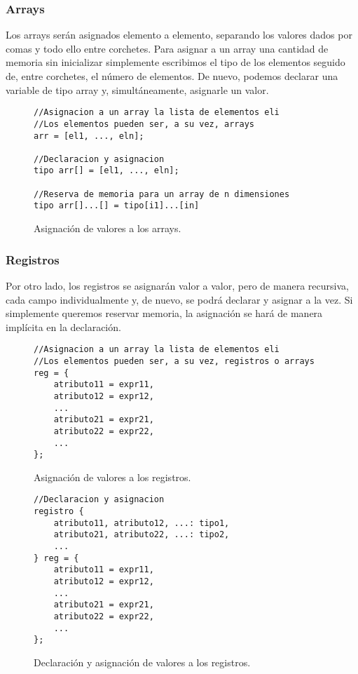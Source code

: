 \subsubsection{Arrays}
Los arrays serán asignados elemento a elemento, separando los valores dados por
comas y todo ello entre corchetes. Para asignar a un array una cantidad de
memoria sin inicializar simplemente escribimos el tipo de los elementos seguido
de, entre corchetes, el número de elementos. De nuevo, podemos declarar una
variable de tipo array y, simultáneamente, asignarle un valor.
\begin{figure}[htbp]
    \centering
    \begin{lstlisting}
//Asignacion a un array la lista de elementos eli
//Los elementos pueden ser, a su vez, arrays
arr = [el1, ..., eln];

//Declaracion y asignacion
tipo arr[] = [el1, ..., eln];

//Reserva de memoria para un array de n dimensiones
tipo arr[]...[] = tipo[i1]...[in] 
    \end{lstlisting}
    \caption{Asignación de valores a los arrays.}
\end{figure}

\subsubsection{Registros}
Por otro lado, los registros se asignarán valor a valor, pero de manera
recursiva, cada campo individualmente y, de nuevo, se podrá declarar y asignar a
la vez. Si simplemente queremos reservar memoria, la asignación se hará de
manera implícita en la declaración.
\begin{figure}[htbp]
    \centering
    \begin{lstlisting}
//Asignacion a un array la lista de elementos eli
//Los elementos pueden ser, a su vez, registros o arrays
reg = {
    atributo11 = expr11,
    atributo12 = expr12,
    ...
    atributo21 = expr21,
    atributo22 = expr22,
    ...
};
    \end{lstlisting}
    \caption{Asignación de valores a los registros.}
\end{figure}

\begin{figure}[htbp]
    \centering
    \begin{lstlisting}
//Declaracion y asignacion
registro {
    atributo11, atributo12, ...: tipo1,
    atributo21, atributo22, ...: tipo2,
    ...
} reg = {
    atributo11 = expr11,
    atributo12 = expr12,
    ...
    atributo21 = expr21,
    atributo22 = expr22,
    ...
};
    \end{lstlisting}
    \caption{Declaración y asignación de valores a los registros.}
\end{figure}

